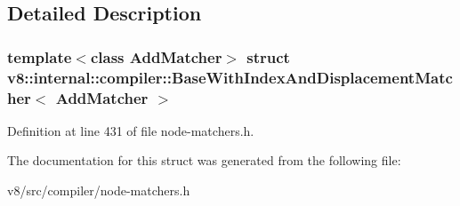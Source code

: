 \subsection{Detailed Description}
\subsubsection*{template$<$class Add\+Matcher$>$\newline
struct v8\+::internal\+::compiler\+::\+Base\+With\+Index\+And\+Displacement\+Matcher$<$ Add\+Matcher $>$}



Definition at line 431 of file node-\/matchers.\+h.



The documentation for this struct was generated from the following file\+:\begin{DoxyCompactItemize}
\item 
v8/src/compiler/node-\/matchers.\+h\end{DoxyCompactItemize}
